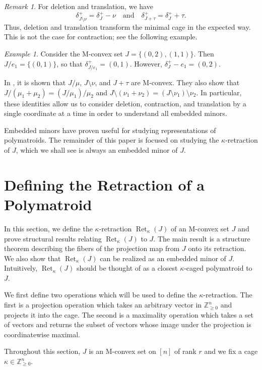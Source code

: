\documentclass[11pt]{article}
\theoremstyle{definition}
\theoremstyle{remark}
\newtheorem{remark}[theorem]{Remark}
\newtheorem{example}[theorem]{Example}
\newcommand{\Zgeqn}{\mathbb{Z}_{\geq 0}^n}     %
\newcommand{\delplus}{\delta_J^+}
\DeclareMathOperator{\Ret}{Ret}                %
\newcommand{\RetK}{\Ret_{\kappa}}              %
\begin{document}
\begin{remark} \label{remark:embedded_minor_cage}
For deletion and translation, we have \[
\delta_{J\setminus \nu}^+ = \delplus - \nu \quad \text{and} \quad \delta_{J + \tau}^+ = \delplus + \tau.
\]
Thus, deletion and translation transform the minimal cage in the expected way. This is not the case for contraction; see the following example.
\end{remark}

\begin{example}
Consider the M-convex set $J = \{(0,2),(1,1)\}$. Then $J/e_1 = \{(0,1)\}$, so that $\delta_{J/e_1}^+ = (0,1)$. However, $\delplus - e_1 = (0,2)$.
\end{example}

In \cite{baker2025representationtheorypolymatroids}, it is shown that $J/\mu$, $J \setminus \nu$, and $J + \tau$ are M-convex. They also show that $J /(\mu_1 + \mu_2) = (J/\mu_1) /\mu_2$ and $J \setminus(\nu_1 + \nu_2) = (J\setminus \nu_1) \setminus \nu_2$. In particular, these identities allow us to consider deletion, contraction, and translation by a single coordinate at a time in order to understand all embedded minors.

Embedded minors have proven useful for studying representations of polymatroids. The remainder of this paper is focused on studying the $\kappa$-retraction of $J$, which we shall see is always an embedded minor of $J$.


\section{Defining the Retraction of a Polymatroid}
In this section, we define the $\kappa$-retraction $\RetK(J)$ of an M-convex set $J$ and prove structural results relating $\RetK(J)$ to $J$. The main result is a structure theorem describing the fibers of the projection map from $J$ onto its retraction. We also show that $\RetK(J)$ can be realized as an embedded minor of $J$. Intuitively, $\RetK(J)$ should be thought of as a closest $\kappa$-caged polymatroid to $J$.

We first define two operations which will be used to define the $\kappa$-retraction. The first is a projection operation which takes an arbitrary vector in $\Zgeqn$ and projects it into the cage. The second is a maximality operation which takes a set of vectors and returns the subset of vectors whose image under the projection is coordinatewise maximal.

Throughout this section, $J$ is an M-convex set on $[n]$ of rank $r$ and we fix a cage $\kappa\in\Zgeqn$.
\end{document}
